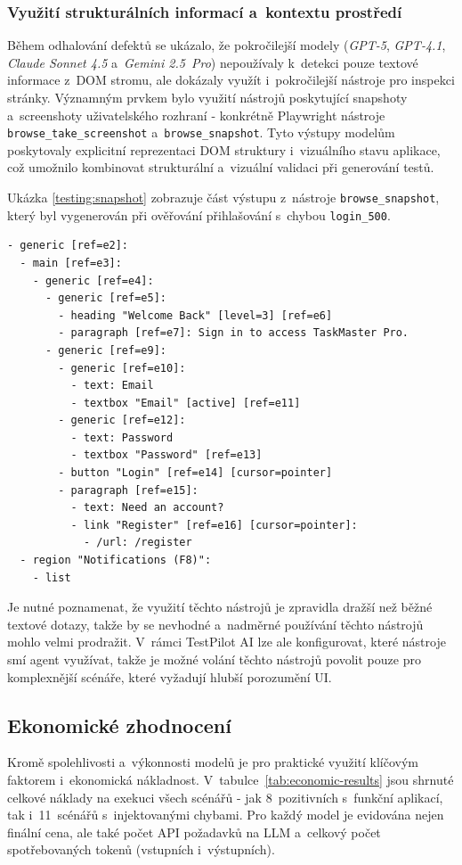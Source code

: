 \documentclass[czech, ing, kiv, he, iso690numb, viewonly]{fasthesis}
\begin{document}
\subsubsection*{Využití strukturálních informací a~kontextu prostředí}
Během odhalování defektů se ukázalo, že pokročilejší modely (\textit{GPT-5}, \textit{GPT-4.1},
\textit{Claude Sonnet 4.5} a~\textit{Gemini 2.5~Pro}) nepoužívaly k~detekci pouze textové informace z~DOM stromu, 
ale dokázaly využít i~pokročilejší nástroje pro inspekci stránky. 
Významným prvkem bylo využití nástrojů poskytující snapshoty a~screenshoty uživatelského rozhraní - 
konkrétně Playwright nástroje \texttt{browse\_take\_screenshot} a~\texttt{browse\_snapshot}.
Tyto výstupy modelům poskytovaly explicitní reprezentaci DOM struktury i~vizuálního stavu aplikace,
což umožnilo kombinovat strukturální a~vizuální validaci při generování testů.

Ukázka \ref{testing:snapshot} zobrazuje část výstupu z~nástroje \texttt{browse\_snapshot}, 
který byl vygenerován při ověřování přihlašování s~chybou \texttt{login\_500}.

\begin{lstlisting}[style=snapshot,
    caption={\protect\centering Ukázka výstupu nástroje \texttt{browse\_snapshot}.},
    label={testing:snapshot},
    float,
    floatplacement=H]
- generic [ref=e2]:
  - main [ref=e3]:
    - generic [ref=e4]:
      - generic [ref=e5]:
        - heading "Welcome Back" [level=3] [ref=e6]
        - paragraph [ref=e7]: Sign in to access TaskMaster Pro.
      - generic [ref=e9]:
        - generic [ref=e10]:
          - text: Email
          - textbox "Email" [active] [ref=e11]
        - generic [ref=e12]:
          - text: Password
          - textbox "Password" [ref=e13]
        - button "Login" [ref=e14] [cursor=pointer]
        - paragraph [ref=e15]:
          - text: Need an account?
          - link "Register" [ref=e16] [cursor=pointer]:
            - /url: /register
  - region "Notifications (F8)":
    - list
\end{lstlisting}

Je nutné poznamenat, že využití těchto nástrojů je zpravidla dražší než běžné textové dotazy,
takže by se nevhodné a~nadměrné používání těchto nástrojů mohlo velmi prodražit.
V~rámci TestPilot AI lze ale konfigurovat, které nástroje smí agent využívat, 
takže je možné volání těchto nástrojů povolit pouze pro komplexnější scénáře, 
které vyžadují hlubší porozumění UI.

\subsection{Ekonomické zhodnocení}
Kromě spolehlivosti a~výkonnosti modelů je pro praktické využití 
klíčovým faktorem i~ekonomická nákladnost. 
V~tabulce~\ref{tab:economic-results} jsou shrnuté celkové náklady na 
exekuci všech scénářů - jak 8~pozitivních s~funkční aplikací, tak i~11~scénářů 
s~injektovanými chybami. Pro každý model je evidována nejen finální cena, 
ale také počet API požadavků na LLM a~celkový počet spotřebovaných tokenů (vstupních i~výstupních).
\end{document}
